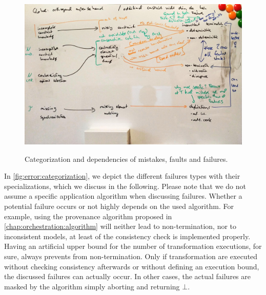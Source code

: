 \begin{figure}
    \centering
    \\
    \includegraphics[width=\textwidth]{figures/correctness/errors/categorization.jpg}
    \caption[Categorization of mistakes, faults and failures]{Categorization and dependencies of mistakes, faults and failures.}
    \label{fig:errors:categorization}
\end{figure}

In \autoref{fig:error:categorization}, we depict the different failures types with their specializations, which we discuss in the following.
Please note that we do not assume a specific application algorithm when discussing failures.
Whether a potential failure occurs or not highly depends on the used algorithm.
For example, using the provenance algorithm proposed in \autoref{chap:orchestration:algorithm} will neither lead to non-termination, nor to inconsistent models, at least of the consistency check is implemented properly.
Having an artificial upper bound for the number of transformation executions, for sure, always prevents from non-termination.
Only if transformation are executed without checking consistency afterwards or without defining an execution bound, the discussed failures can actually occur.
In other cases, the actual failures are masked by the algorithm simply aborting and returning $\bot$.


